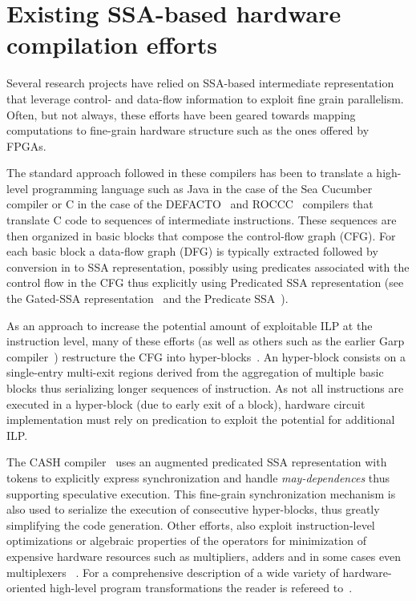 \section{Existing SSA-based hardware compilation efforts}
Several research projects have relied on SSA-based intermediate representation that leverage control- and data-flow information to exploit fine grain parallelism. Often, but not always, these efforts have been geared towards mapping computations to fine-grain hardware structure such as the ones offered by FPGAs.

The standard approach followed in these compilers has been to translate a high-level programming language such as Java in the case of the Sea Cucumber~\cite{Tripp:FPL02} compiler or C in the case of the DEFACTO~\cite{DEFACTO:2005} and ROCCC~\cite{Najjar:ROCCC08} compilers that translate C code to sequences of intermediate instructions. These sequences are then organized in basic blocks that compose the control-flow graph (CFG). For each basic block a data-flow graph (DFG) is typically extracted followed by conversion in to SSA representation, possibly using predicates associated with the control flow in the CFG thus explicitly using Predicated SSA representation (see the Gated-SSA representation~\cite{Tu95gated} and the Predicate SSA~\cite{Carter:PACT99,Ferriere:2007:SCOPES,Stoutchinin:2001:MICRO}).

As an approach to increase the potential amount of exploitable ILP at the instruction level, many of these efforts (as well as others such as the earlier Garp compiler~\cite{Callahan:Computer00}) restructure the CFG into hyper-blocks~\cite{Mahlke:1992:ECS:144965.144998}.  An hyper-block consists on a single-entry multi-exit regions derived from the aggregation of multiple basic blocks thus serializing longer sequences of instruction. 
As not all instructions are executed in a hyper-block (due to early exit of a block), hardware circuit implementation must rely on predication to exploit the potential for additional ILP. 

The CASH compiler~\cite{Budiu:FPL02} uses an augmented predicated SSA representation with tokens to explicitly express synchronization and handle {\em may-dependences} thus supporting speculative execution.  This fine-grain synchronization mechanism is also used to serialize the execution of consecutive hyper-blocks, thus greatly simplifying the code generation. Other efforts, also exploit instruction-level optimizations or algebraic properties of the operators for minimization of expensive hardware resources such as multipliers, adders and in some cases even multiplexers ~\cite{Verma08,Nancekievill05}. For a comprehensive description of a wide variety of hardware-oriented high-level program transformations the reader is refereed to~\cite{Cardoso:2008}.

